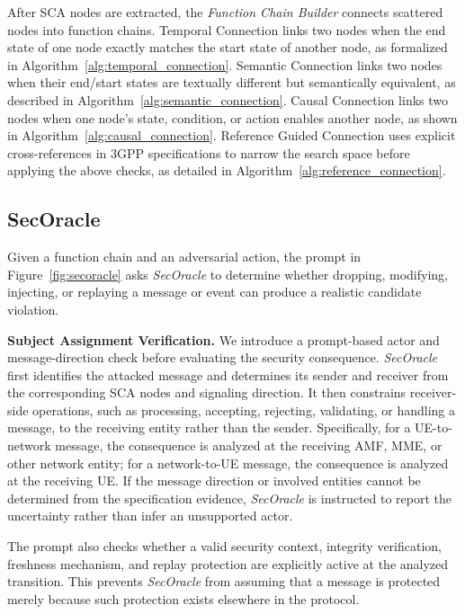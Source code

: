 \documentclass[sigconf]{acmart}
\begin{document}
{After SCA nodes are extracted, the \textit{Function Chain Builder} connects scattered nodes into function chains. Temporal Connection links two nodes when the end state of one node exactly matches the start state of another node, as formalized in Algorithm~\ref{alg:temporal_connection}. Semantic Connection links two nodes when their end/start states are textually different but semantically equivalent, as described in Algorithm~\ref{alg:semantic_connection}. Causal Connection links two nodes when one node's state, condition, or action enables another node, as shown in Algorithm~\ref{alg:causal_connection}. Reference Guided Connection uses explicit cross-references in 3GPP specifications to narrow the search space before applying the above checks, as detailed in Algorithm~\ref{alg:reference_connection}.




\subsection{SecOracle}

Given a function chain and an adversarial action, the prompt in
Figure~\ref{fig:secoracle} asks \textit{SecOracle} to determine whether dropping, modifying, injecting, or replaying a message or event can produce a realistic candidate violation.

\noindent \textbf{Subject Assignment Verification.} We introduce a prompt-based actor and message-direction check before evaluating the security consequence. \textit{SecOracle} first identifies the attacked message and determines its sender and receiver from the corresponding SCA nodes and signaling direction. It then constrains receiver-side operations, such as processing, accepting, rejecting, validating, or handling a message, to the receiving entity rather than the sender.
Specifically, for a UE-to-network message, the consequence is analyzed at the receiving AMF, MME, or other network entity; for a
network-to-UE message, the consequence is analyzed at the receiving UE. If the message direction or involved entities cannot be determined from the specification evidence, \textit{SecOracle} is instructed to report the uncertainty rather than infer an unsupported actor.

The prompt also checks whether a valid security context, integrity
verification, freshness mechanism, and replay protection are explicitly active at the analyzed transition. This prevents \textit{SecOracle} from assuming that a message is protected merely because such protection exists elsewhere in the protocol.

}
\end{document}
